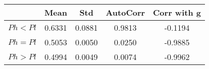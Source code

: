 \begin{tiny}\begin{tabular}{|l|c|c|c|c|}
\hline
&\textbf{Mean}&\textbf{Std}&\textbf{AutoCorr}&\textbf{Corr with g}\\\hline
\textbf{$Ph<Pl$}&0.6331&0.0881&0.9813&-0.1194\\\hline
\textbf{$Ph=Pl$}&0.5053&0.0050&0.0250&-0.9885\\\hline
\textbf{$Ph>Pl$}&0.4994&0.0049&0.0074&-0.9962\\\hline
\end{tabular}
\end{tiny}